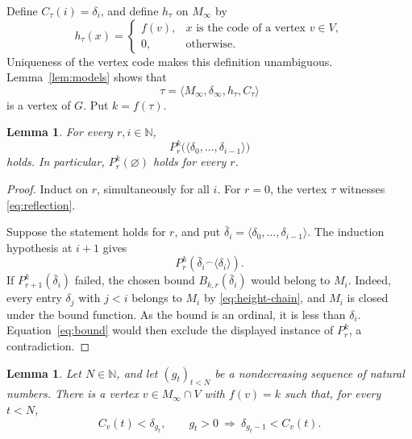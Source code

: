 \documentclass[11pt,leqno]{amsart}
\newtheorem{lemma}[theorem]{Lemma}
\theoremstyle{definition}
\numberwithin{equation}{section}
\newcommand{\N}{\mathbb N}
\newcommand{\seq}[1]{\langle #1\rangle}
\newcommand{\cat}{\mathbin{{}^\frown}}
\begin{document}
Define $C_\tau(i)=\delta_i$, and define $h_\tau$ on $M_\infty$ by
\begin{equation}\label{eq:memory}
h_\tau(x)=\begin{cases}
f(v),&x\text{ is the code of a vertex }v\in V,\\
0,&\text{otherwise}.
\end{cases}
\end{equation}
Uniqueness of the vertex code makes this definition unambiguous. Lemma~\ref{lem:models} shows that
\begin{equation}\label{eq:diagonal}
\tau=\seq{M_\infty,\delta_\infty,h_\tau,C_\tau}
\end{equation}
is a vertex of $G$. Put $k=f(\tau)$.

\begin{lemma}\label{lem:reflection}
For every $r,i\in\N$,
\begin{equation}\label{eq:reflection}
P_r^k\bigl(\seq{\delta_0,\ldots,\delta_{i-1}}\bigr)
\end{equation}
holds. In particular, $P_r^k(\varnothing)$ holds for every $r$.
\end{lemma}

\begin{proof}
Induct on $r$, simultaneously for all $i$. For $r=0$, the vertex $\tau$ witnesses \eqref{eq:reflection}.

Suppose the statement holds for $r$, and put $\bar\delta_i=\seq{\delta_0,\ldots,\delta_{i-1}}$. The induction hypothesis at $i+1$ gives
\[
P_r^k(\bar\delta_i\cat\seq{\delta_i}).
\]
If $P_{r+1}^k(\bar\delta_i)$ failed, the chosen bound $B_{k,r}(\bar\delta_i)$ would belong to $M_i$. Indeed, every entry $\delta_j$ with $j<i$ belongs to $M_i$ by \eqref{eq:height-chain}, and $M_i$ is closed under the bound function. As the bound is an ordinal, it is less than $\delta_i$. Equation~\eqref{eq:bound} would then exclude the displayed instance of $P_r^k$, a contradiction.
\end{proof}

\begin{lemma}\label{lem:gaps}
Let $N\in\N$, and let $(g_t)_{t<N}$ be a nondecreasing sequence of natural numbers. There is a vertex $v\in M_\infty\cap V$ with $f(v)=k$ such that, for every $t<N$,
\begin{equation}\label{eq:gaps}
C_v(t)<\delta_{g_t},
\qquad
 g_t>0\ \Longrightarrow\ \delta_{g_t-1}<C_v(t).
\end{equation}
\end{lemma}
\end{document}
